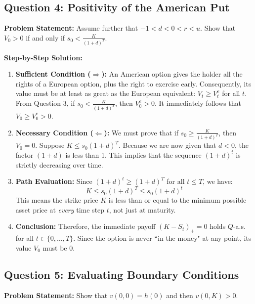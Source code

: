 \subsection*{Question 4: Positivity of the American Put}

\textbf{Problem Statement:}
Assume further that $-1 < d < 0 < r < u$. Show that $V_0 > 0$ if and only if $s_0 < \frac{K}{(1+d)^T}$.

\textbf{Step-by-Step Solution:}
\begin{enumerate}
    \item \textbf{Sufficient Condition ($\Rightarrow$):} An American option gives the holder all the rights of a European option, plus the right to exercise early. Consequently, its value must be at least as great as the European equivalent: $V_t \ge V_t^e$ for all $t$. 
    From Question 3, if $s_0 < \frac{K}{(1+d)^T}$, then $V_0^e > 0$. It immediately follows that $V_0 \ge V_0^e > 0$.
    
    \item \textbf{Necessary Condition ($\Leftarrow$):} We must prove that if $s_0 \ge \frac{K}{(1+d)^T}$, then $V_0 = 0$. 
    Suppose $K \le s_0(1+d)^T$. Because we are now given that $d < 0$, the factor $(1+d)$ is less than 1. This implies that the sequence $(1+d)^t$ is strictly decreasing over time.
    \item \textbf{Path Evaluation:} Since $(1+d)^t \ge (1+d)^T$ for all $t \le T$, we have:
    \begin{equation*}
        K \le s_0(1+d)^T \le s_0(1+d)^t
    \end{equation*}
    This means the strike price $K$ is less than or equal to the minimum possible asset price at \textit{every} time step $t$, not just at maturity. 
    \item \textbf{Conclusion:} Therefore, the immediate payoff $(K-S_t)_+ = 0$ holds $Q$-a.s. for all $t \in \{0, \dots, T\}$. Since the option is never ``in the money" at any point, its value $V_0$ must be 0.
\end{enumerate}

\subsection*{Question 5: Evaluating Boundary Conditions}

\textbf{Problem Statement:}
Show that $v(0,0) = h(0)$ and then $v(0,K) > 0$.

